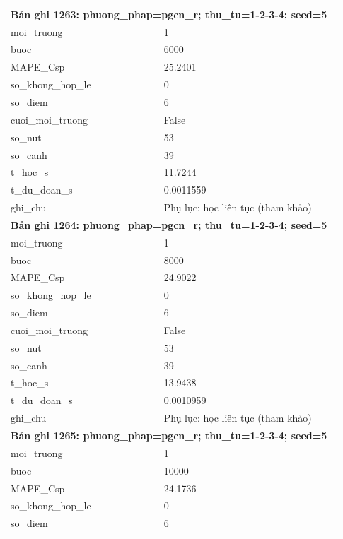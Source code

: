 \begin{longtable}{p{0.43\linewidth}p{0.50\linewidth}}
\midrule
\multicolumn{2}{p{0.95\linewidth}}{\textbf{Bản ghi 1263: phuong\_phap=pgcn\_r; thu\_tu=1-2-3-4; seed=5}} \\
moi\_\allowbreak truong & 1 \\
buoc & 6000 \\
MAPE\_\allowbreak Csp & 25.2401 \\
so\_\allowbreak khong\_\allowbreak hop\_\allowbreak le & 0 \\
so\_\allowbreak diem & 6 \\
cuoi\_\allowbreak moi\_\allowbreak truong & False \\
so\_\allowbreak nut & 53 \\
so\_\allowbreak canh & 39 \\
t\_\allowbreak hoc\_\allowbreak s & 11.7244 \\
t\_\allowbreak du\_\allowbreak doan\_\allowbreak s & 0.0011559 \\
ghi\_\allowbreak chu & Phụ lục: học liên tục (tham khảo) \\
\midrule
\multicolumn{2}{p{0.95\linewidth}}{\textbf{Bản ghi 1264: phuong\_phap=pgcn\_r; thu\_tu=1-2-3-4; seed=5}} \\
moi\_\allowbreak truong & 1 \\
buoc & 8000 \\
MAPE\_\allowbreak Csp & 24.9022 \\
so\_\allowbreak khong\_\allowbreak hop\_\allowbreak le & 0 \\
so\_\allowbreak diem & 6 \\
cuoi\_\allowbreak moi\_\allowbreak truong & False \\
so\_\allowbreak nut & 53 \\
so\_\allowbreak canh & 39 \\
t\_\allowbreak hoc\_\allowbreak s & 13.9438 \\
t\_\allowbreak du\_\allowbreak doan\_\allowbreak s & 0.0010959 \\
ghi\_\allowbreak chu & Phụ lục: học liên tục (tham khảo) \\
\midrule
\multicolumn{2}{p{0.95\linewidth}}{\textbf{Bản ghi 1265: phuong\_phap=pgcn\_r; thu\_tu=1-2-3-4; seed=5}} \\
moi\_\allowbreak truong & 1 \\
buoc & 10000 \\
MAPE\_\allowbreak Csp & 24.1736 \\
so\_\allowbreak khong\_\allowbreak hop\_\allowbreak le & 0 \\
so\_\allowbreak diem & 6 \\

\end{longtable}
